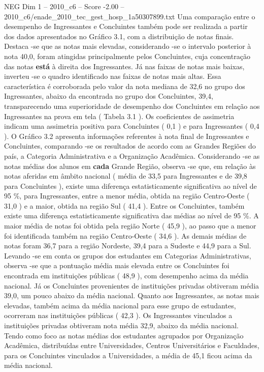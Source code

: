 \begin{textsample}{NEG Dim 1 – 2010\_c6 – Score -2.00 – 2010\_c6/enade\_2010\_tec\_gest\_hosp\_1a50307899.txt}
Uma comparação entre o desempenho de Ingressantes e Concluintes também pode ser realizada a partir dos dados apresentados no Gráfico 3.1, com a distribuição de notas finais.
Destaca -se que as notas mais elevadas, considerando -se o intervalo posterior à nota 40,0, foram atingidas principalmente pelos Concluintes, cuja concentração das notas \textbf{está} à direita dos Ingressantes.
Já nas faixas de notas mais baixas, inverteu -se o quadro identificado nas faixas de notas mais altas.
Essa característica é corroborada pelo valor da nota mediana de 32,6 no grupo dos Ingressantes, abaixo da encontrada no grupo dos Concluintes, 39,4, transparecendo uma superioridade de desempenho dos Concluintes em relação aos Ingressantes na prova em tela ( Tabela 3.1 ).
Os coeficientes de assimetria indicam uma assimetria positiva para Concluintes ( 0,1 ) e para Ingressantes ( 0,4 ).
O Gráfico 3.2 apresenta informações referentes à nota final de Ingressantes e Concluintes, comparando -se os resultados de acordo com as Grandes Regiões do país, a Categoria Administrativa e a Organização Acadêmica.
Considerando -se as notas médias dos alunos em \textbf{cada} Grande Região, observa -se que, em relação às notas aferidas em âmbito nacional ( média de 33,5 para Ingressantes e de 39,8 para Concluintes ), existe uma diferença estatisticamente significativa ao nível de 95 \%, para Ingressantes, entre a menor média, obtida na região Centro-Oeste ( 31,0 ) e a maior, obtida na região Sul ( 41,4 ).
Entre os Concluintes, também existe uma diferença estatisticamente significativa das médias ao nível de 95 \%.
A maior média de notas foi obtida pela região Norte ( 45,9 ), ao passo que a menor foi identificada também na região Centro-Oeste ( 34,6 ).
As demais médias de notas foram 36,7 para a região Nordeste, 39,4 para a Sudeste e 44,9 para a Sul.
Levando -se em conta os grupos dos estudantes em Categorias Administrativas, observa -se que a pontuação média mais elevada entre os Concluintes foi encontrada em instituições públicas ( 48,9 ), com desempenho acima da média nacional.
Já os Concluintes provenientes de instituições privadas obtiveram média 39,0, um pouco abaixo da média nacional.
Quanto aos Ingressantes, as notas mais elevadas, também acima da média nacional para esse grupo de estudantes, ocorreram nas instituições públicas ( 42,3 ).
Os Ingressantes vinculados a instituições privadas obtiveram nota média 32,9, abaixo da média nacional.
Tendo como foco as notas médias dos estudantes agrupados por Organização Acadêmica, distribuídas entre Universidades, Centros Universitários e Faculdades, para os Concluintes vinculados a Universidades, a média de 45,1 ficou acima da média nacional.

\end{textsample}
